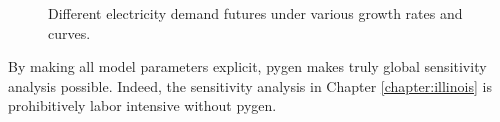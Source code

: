 \begin{figure}[H]
  \centering
  \resizebox{0.8\textwidth}{!}{}
  \caption{Different electricity demand futures under various growth rates and curves.}
  \label{fig:dem-growth}
\end{figure}

By making all model parameters explicit, \gls{pygen} makes truly global sensitivity
analysis possible. Indeed, the sensitivity analysis in Chapter \ref{chapter:illinois}
is prohibitively labor intensive without \gls{pygen}.
